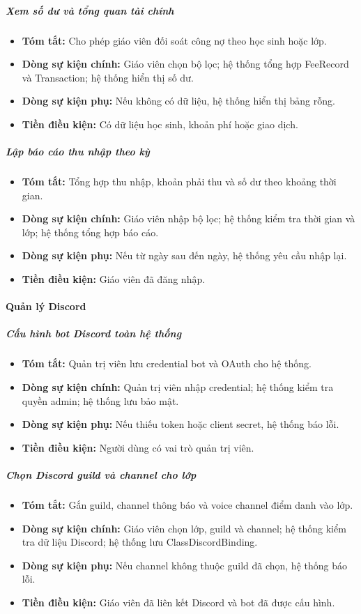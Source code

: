 \documentclass[12pt,a4paper]{article}
\begin{document}
\subparagraph{Xem số dư và tổng quan tài chính}
\begin{itemize}[leftmargin=*]
\item \textbf{Tóm tắt:} Cho phép giáo viên đối soát công nợ theo học sinh hoặc lớp.
\item \textbf{Dòng sự kiện chính:} Giáo viên chọn bộ lọc; hệ thống tổng hợp FeeRecord và Transaction; hệ thống hiển thị số dư.
\item \textbf{Dòng sự kiện phụ:} Nếu không có dữ liệu, hệ thống hiển thị bảng rỗng.
\item \textbf{Tiền điều kiện:} Có dữ liệu học sinh, khoản phí hoặc giao dịch.
\end{itemize}

\subparagraph{Lập báo cáo thu nhập theo kỳ}
\begin{itemize}[leftmargin=*]
\item \textbf{Tóm tắt:} Tổng hợp thu nhập, khoản phải thu và số dư theo khoảng thời gian.
\item \textbf{Dòng sự kiện chính:} Giáo viên nhập bộ lọc; hệ thống kiểm tra thời gian và lớp; hệ thống tổng hợp báo cáo.
\item \textbf{Dòng sự kiện phụ:} Nếu từ ngày sau đến ngày, hệ thống yêu cầu nhập lại.
\item \textbf{Tiền điều kiện:} Giáo viên đã đăng nhập.
\end{itemize}

\paragraph{Quản lý Discord}

\subparagraph{Cấu hình bot Discord toàn hệ thống}
\begin{itemize}[leftmargin=*]
\item \textbf{Tóm tắt:} Quản trị viên lưu credential bot và OAuth cho hệ thống.
\item \textbf{Dòng sự kiện chính:} Quản trị viên nhập credential; hệ thống kiểm tra quyền admin; hệ thống lưu bảo mật.
\item \textbf{Dòng sự kiện phụ:} Nếu thiếu token hoặc client secret, hệ thống báo lỗi.
\item \textbf{Tiền điều kiện:} Người dùng có vai trò quản trị viên.
\end{itemize}

\subparagraph{Chọn Discord guild và channel cho lớp}
\begin{itemize}[leftmargin=*]
\item \textbf{Tóm tắt:} Gắn guild, channel thông báo và voice channel điểm danh vào lớp.
\item \textbf{Dòng sự kiện chính:} Giáo viên chọn lớp, guild và channel; hệ thống kiểm tra dữ liệu Discord; hệ thống lưu ClassDiscordBinding.
\item \textbf{Dòng sự kiện phụ:} Nếu channel không thuộc guild đã chọn, hệ thống báo lỗi.
\item \textbf{Tiền điều kiện:} Giáo viên đã liên kết Discord và bot đã được cấu hình.
\end{itemize}
\end{document}
